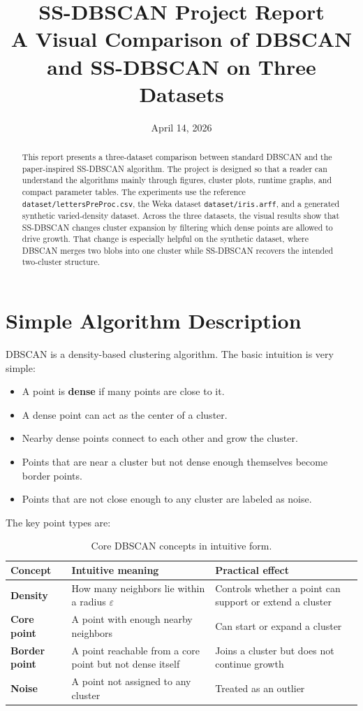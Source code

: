 \documentclass[11pt,a4paper]{article}
\title{\textbf{SS-DBSCAN Project Report}\\[0.4em]
\large A Visual Comparison of DBSCAN and SS-DBSCAN on Three Datasets}
\author{}
\date{April 14, 2026}
\begin{document}
\maketitle

\begin{abstract}
This report presents a three-dataset comparison between standard DBSCAN and the
paper-inspired SS-DBSCAN algorithm. The project is designed so that a reader can
understand the algorithms mainly through figures, cluster plots, runtime graphs,
and compact parameter tables. The experiments use the reference
\texttt{dataset/lettersPreProc.csv}, the Weka dataset
\texttt{dataset/iris.arff}, and a generated synthetic varied-density dataset.
Across the three datasets, the visual results show that SS-DBSCAN changes
cluster expansion by filtering which dense points are allowed to drive growth.
That change is especially helpful on the synthetic dataset, where DBSCAN merges
two blobs into one cluster while SS-DBSCAN recovers the intended two-cluster
structure.
\end{abstract}

\tableofcontents
\clearpage

\section{Simple Algorithm Description}

DBSCAN is a density-based clustering algorithm. The basic intuition is very
simple:

\begin{itemize}
\item A point is \textbf{dense} if many points are close to it.
\item A dense point can act as the center of a cluster.
\item Nearby dense points connect to each other and grow the cluster.
\item Points that are near a cluster but not dense enough themselves become
border points.
\item Points that are not close enough to any cluster are labeled as noise.
\end{itemize}

The key point types are:

\begin{table}[H]
\centering
\small
\begin{tabularx}{\textwidth}{>{\bfseries}lYY}
\toprule
Concept & Intuitive meaning & Practical effect \\
\midrule
Density & How many neighbors lie within a radius $\varepsilon$ & Controls whether a point can support or extend a cluster \\
Core point & A point with enough nearby neighbors & Can start or expand a cluster \\
Border point & A point reachable from a core point but not dense itself & Joins a cluster but does not continue growth \\
Noise & A point not assigned to any cluster & Treated as an outlier \\
\bottomrule
\end{tabularx}
\caption{Core DBSCAN concepts in intuitive form.}
\end{table}
\end{document}
